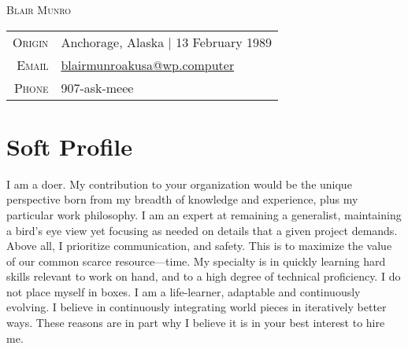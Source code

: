 \documentclass[letter,11pt]{article}
\begin{document}
\begin{center}

\huge \textsc{Blair Munro} \hspace{0cm}

\bigskip
\enlargethispage{\baselineskip}
\enlargethispage{\baselineskip}
\enlargethispage{\baselineskip}
\enlargethispage{\baselineskip}

\footnotesize{
\hspace{-38.58pt} %
\begin{tabular}{r|p{11.1cm}} %

		\textsc{Origin}	
	&	Anchorage, Alaska | 13 February 1989
	\\
		\rule{0pt}{12pt}
		\textsc{Email}
	&	\href{mailto:blairmunroakusa@wp.computer}{blairmunroakusa@wp.computer}
	\\
		\rule{0pt}{12pt}
		\textsc{Phone}
	&	907-ask-meee
	\\

\end{tabular}
}
\vspace{10pt}

\section{Soft Profile}

\vspace{-4pt}

\end{center}

\footnotesize{
\noindent I am a doer. My contribution to your organization would be the unique perspective born from my breadth of knowledge and experience, plus my particular work philosophy. I am an expert at remaining a generalist, maintaining a bird's eye view yet focusing as needed on details that a given project demands. Above all, I prioritize communication, and safety. This is to maximize the value of our common scarce resource---time. My specialty is in quickly learning hard skills relevant to work on hand, and to a high degree of technical proficiency. I do not place myself in boxes. I am a life-learner, adaptable and continuously evolving. I believe in continuously integrating world pieces in iteratively better ways. These reasons are in part why I believe it is in your best interest to hire me.
}
\end{document}
